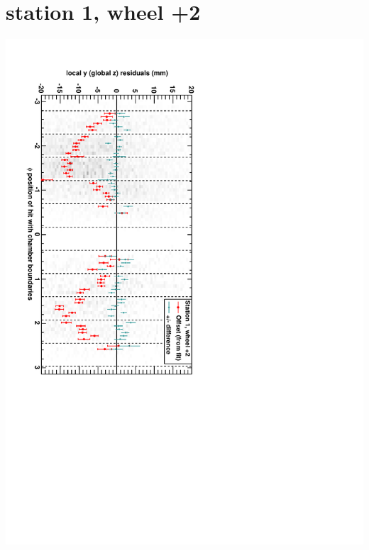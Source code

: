\documentclass[compress]{beamer}
\begin{document}
\section*{station 1, wheel +2}
\begin{frame} \vfill \mbox{\hspace{-1 cm}\includegraphics[height=1.2\linewidth, angle=90]{DTzVsPhi_st1_whE.pdf}} \end{frame}
\end{document}

